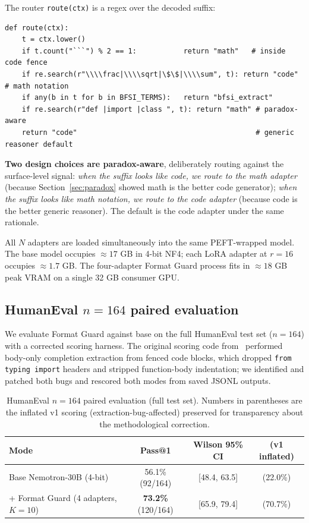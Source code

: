 \documentclass{article}
\begin{document}
The router \texttt{route(ctx)} is a regex over the decoded suffix:
\begin{verbatim}
def route(ctx):
    t = ctx.lower()
    if t.count("```") % 2 == 1:           return "math"   # inside code fence
    if re.search(r"\\\\frac|\\\\sqrt|\$\$|\\\\sum", t): return "code"   # math notation
    if any(b in t for b in BFSI_TERMS):   return "bfsi_extract"
    if re.search(r"def |import |class ", t): return "math" # paradox-aware
    return "code"                                          # generic reasoner default
\end{verbatim}

\textbf{Two design choices are paradox-aware}, deliberately routing against the surface-level signal: \emph{when the suffix looks like code, we route to the math adapter} (because Section~\ref{sec:paradox} showed math is the better code generator); \emph{when the suffix looks like math notation, we route to the code adapter} (because code is the better generic reasoner). The default is the code adapter under the same rationale.

All $N$ adapters are loaded simultaneously into the same PEFT-wrapped model. The base model occupies $\approx 17$ GB in 4-bit NF4; each LoRA adapter at $r=16$ occupies $\approx 1.7$ GB. The four-adapter Format Guard process fits in $\approx 18$ GB peak VRAM on a single 32 GB consumer GPU.

\subsection{HumanEval $n=164$ paired evaluation}
\label{sec:human-eval}

We evaluate Format Guard against base on the full HumanEval test set ($n=164$) with a corrected scoring harness. The original scoring code from~\citet{chen2021humaneval} performed body-only completion extraction from fenced code blocks, which dropped \texttt{from typing import} headers and stripped function-body indentation; we identified and patched both bugs and rescored both modes from saved JSONL outputs.

\begin{table}[h]
  \caption{HumanEval $n=164$ paired evaluation (full test set). Numbers in parentheses are the inflated v1 scoring (extraction-bug-affected) preserved for transparency about the methodological correction.}
  \label{tab:humaneval}
  \centering
  \begin{tabular}{lccc}
    \toprule
    Mode & Pass@1 & Wilson 95\% CI & (v1 inflated) \\
    \midrule
    Base Nemotron-30B (4-bit) & 56.1\% (92/164) & [48.4, 63.5] & (22.0\%) \\
    + Format Guard (4 adapters, $K{=}10$) & \textbf{73.2\%} (120/164) & [65.9, 79.4] & (70.7\%) \\
    \bottomrule
  \end{tabular}
\end{table}
\end{document}
